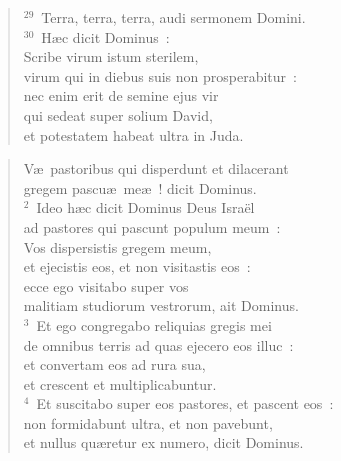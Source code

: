 \begin{flushleft}
\begin{verse}
${}^{29}$~Terra, terra, terra, audi sermonem Domini.\\
${}^{30}$~H\ae c dicit Dominus~:\\ Scribe virum istum sterilem,\\ virum qui in diebus suis non prosperabitur~:\\ nec enim erit de semine ejus vir\\ qui sedeat super solium David,\\ et potestatem habeat ultra in Juda.\end{verse}\end{flushleft}


\begin{flushleft}\begin{verse}\vspace{-19pt}\hspace{6pt}V\ae\ pastoribus qui disperdunt et dilacerant\\\hspace{6pt} gregem pascu\ae\ me\ae~! dicit Dominus.\\
${}^{2}$~Ideo h\ae c dicit Dominus Deus Isra\"el\\ ad pastores qui pascunt populum meum~:\\ Vos dispersistis gregem meum,\\ et ejecistis eos, et non visitastis eos~:\\ ecce ego visitabo super vos\\ malitiam studiorum vestrorum, ait Dominus.\\
${}^{3}$~Et ego congregabo reliquias gregis mei\\ de omnibus terris ad quas ejecero eos illuc~:\\ et convertam eos ad rura sua,\\ et crescent et multiplicabuntur.\\
${}^{4}$~Et suscitabo super eos pastores, et pascent eos~:\\ non formidabunt ultra, et non pavebunt,\\ et nullus qu\ae retur ex numero, dicit Dominus.\end{verse}\end{flushleft}


